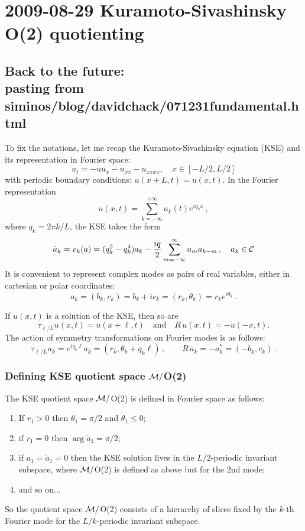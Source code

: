 \section{2009-08-29 Kuramoto-Sivashinsky O(2) quotienting}

\subsection{Back to the future:\\ pasting from siminos/blog/davidchack/071231fundamental.html}

\medskip{}
To fix the notations, let me recap the Kuramoto-Sivashinsky equation (KSE) and its representation in Fourier space:
\[ u_t = -uu_x - u_{xx} - u_{xxxx},  \quad x \in [-L/2, L/2] \]
with periodic boundary conditions:  $u(x+L,t) = u(x,t)$.  In the Fourier representation
\[ u(x,t)=\sum_{k=-\infty}^{+\infty} a_k (t) e^{ i q_k x }\,,\]
where $ q_k = 2\pi k/L$, the KSE takes the form
\[ \dot{a}_k = v_k(a) = (q_k^2 - q_k^4)a_k - \frac{iq}{2}\sum_{m=-\infty}^{\infty}
    a_m a_{k-m}\,,\quad a_k \in {\cal C}\]
It is convenient to represent complex modes as pairs of real variables, either in cartesian or polar coordinates:
\[ a_k = (b_k, c_k) = b_k + ic_k = (r_k, \theta_k) = r_k e^{i\theta_k}\,. \]

 If $u(x,t)$ is a solution of the KSE, then so are
\[ \tau_{\ell/L} u(x,t) = u(x+\ell,t) \quad\mbox{and}\quad R\,u(x,t) = -u(-x,t).\]
The action of symmetry transformations on Fourier modes is as follows:
\[ \tau_{\ell/L} a_k = e^{iq_k \ell} a_k = (r_k, \theta_k + q_k \ell) \,,\qquad R\,a_k = -a_k^\ast = (-b_k, c_k)\,.\]

\subsubsection{Defining KSE quotient space ${\cal M}/$O(2)} %
\label{sect:RLDslice}

The KSE quotient space ${\cal M}/$O(2) is defined in Fourier space as follows:
\begin{enumerate}
\item If $r_1 > 0$ then $\theta_1 = \pi/2$ and $\dot{\theta}_1 \leq 0$;
\item if $r_1 = 0$ then $\arg \dot{a}_1 = \pi/2$;
\item if $a_1 = \dot{a}_1 = 0$ then the KSE solution lives in
        the $L/2$-periodic invariant subspace, where ${\cal M}/$O(2) is
        defined as above but for the 2nd mode;
\item and so on...
\end{enumerate}
So the quotient space ${\cal M}/$O(2) consists of a hierarchy of
slices fixed by the $k$-th Fourier mode for the
$L/k$-periodic invariant subspace.

